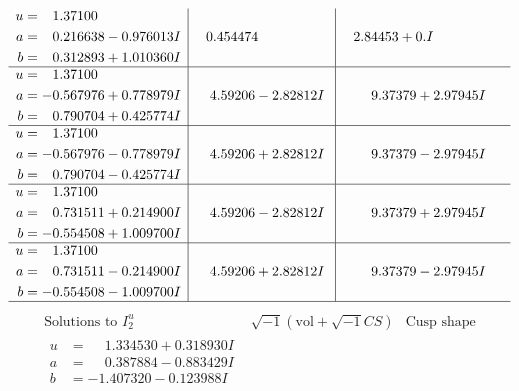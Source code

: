 \documentclass[1p]{elsarticle_modified}
\theoremstyle{definition}
\newcommand{\I}{\sqrt{-1}}
\begin{document}
$$\begin{array}{c|c|c}
\begin{aligned}
u &= \phantom{-}1.37100\phantom{ +0.000000I} \\
a &= \phantom{-}0.216638 - 0.976013 I \\
b &= \phantom{-}0.312893 + 1.010360 I\end{aligned}
 & \phantom{-}0.454474\phantom{ +0.000000I} & \phantom{-}2.84453 + 0. I\phantom{ +0.000000I} \\ \hline\begin{aligned}
u &= \phantom{-}1.37100\phantom{ +0.000000I} \\
a &= -0.567976 + 0.778979 I \\
b &= \phantom{-}0.790704 + 0.425774 I\end{aligned}
 & \phantom{-}4.59206 - 2.82812 I & \phantom{-}9.37379 + 2.97945 I \\ \hline\begin{aligned}
u &= \phantom{-}1.37100\phantom{ +0.000000I} \\
a &= -0.567976 - 0.778979 I \\
b &= \phantom{-}0.790704 - 0.425774 I\end{aligned}
 & \phantom{-}4.59206 + 2.82812 I & \phantom{-}9.37379 - 2.97945 I \\ \hline\begin{aligned}
u &= \phantom{-}1.37100\phantom{ +0.000000I} \\
a &= \phantom{-}0.731511 + 0.214900 I \\
b &= -0.554508 + 1.009700 I\end{aligned}
 & \phantom{-}4.59206 - 2.82812 I & \phantom{-}9.37379 + 2.97945 I \\ \hline\begin{aligned}
u &= \phantom{-}1.37100\phantom{ +0.000000I} \\
a &= \phantom{-}0.731511 - 0.214900 I \\
b &= -0.554508 - 1.009700 I\end{aligned}
 & \phantom{-}4.59206 + 2.82812 I & \phantom{-}9.37379 - 2.97945 I\\
 \hline 
 \end{array}$$\newpage$$\begin{array}{c|c|c}  
\text{Solutions to }I^u_{2}& \I (\text{vol} + \sqrt{-1}CS) & \text{Cusp shape}\\
 \hline 
\begin{aligned}
u &= \phantom{-}1.334530 + 0.318930 I \\
a &= \phantom{-}0.387884 - 0.883429 I \\
b &= -1.407320 - 0.123988 I\end{aligned}

\end{array}$$
\end{document}
